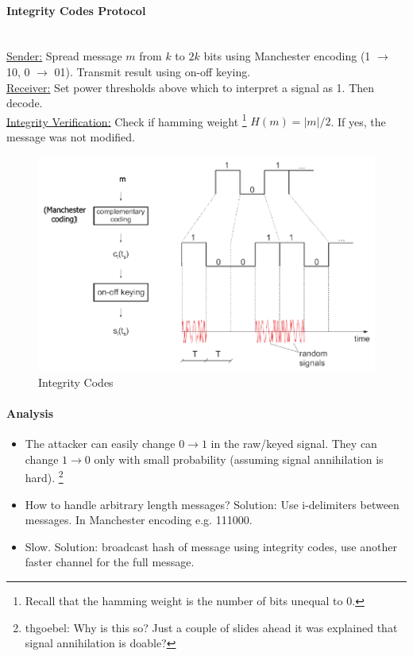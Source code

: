 \paragraph{Integrity Codes Protocol} \mbox{}\\
\underline{Sender:}
Spread message $m$ from $k$ to $2k$ bits using Manchester encoding (1 $\rightarrow$ 10, 0 $\rightarrow$ 01).
Transmit result using on-off keying.
\\
\underline{Receiver:}
Set power thresholds above which to interpret a signal as 1. Then decode.
\\
\underline{Integrity Verification:}
Check if hamming weight%
\footnote{Recall that the hamming weight is the number of bits unequal to 0.}
$H(m)=|m|/2$. If yes, the message was not modified.

\begin{figure}[h]
	\centering
	\includegraphics[scale=0.4]{images/7-integrity-code.png}
	\caption{Integrity Codes}
	\label{fig:integrity-code}
\end{figure}

\paragraph{Analysis}
\begin{itemize}
	\item The attacker can easily change $0 \rightarrow 1$ in the raw/keyed signal.
	They can change $1 \rightarrow 0$ only with small probability (assuming signal annihilation is hard).%
	\footnote{thgoebel: Why is this so? Just a couple of slides ahead it was explained that signal annihilation is doable?}
	\item How to handle arbitrary length messages?
	Solution: Use i-delimiters between messages. In Manchester encoding e.g. 111000.
	\item Slow. Solution: broadcast hash of message using integrity codes, use another faster channel for the full message.
\end{itemize}

